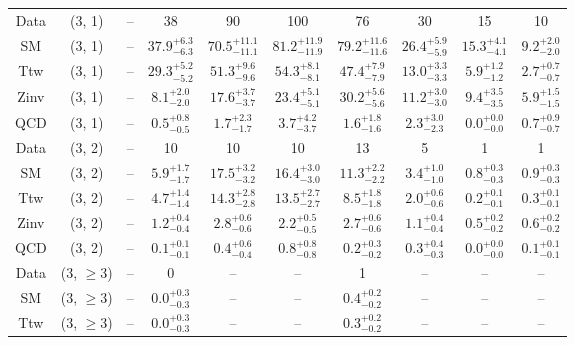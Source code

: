 \begin{table}[h!]
{\begin{tabular}{cccccccccc}
	Data & (3, 1) & -- & 38 & 90 & 100 & 76 & 30 & 15 & 10 \\[0.5ex] 
	SM & (3, 1) & -- & $37.9^{+ 6.3 }_{- 6.3 }$ & $70.5^{+ 11.1 }_{- 11.1 }$ & $81.2^{+ 11.9 }_{- 11.9 }$ & $79.2^{+ 11.6 }_{- 11.6 }$ & $26.4^{+ 5.9 }_{- 5.9 }$ & $15.3^{+ 4.1 }_{- 4.1 }$ & $9.2^{+ 2.0 }_{- 2.0 }$ \\[0.5ex] 
	Ttw & (3, 1) & -- & $29.3^{+ 5.2 }_{- 5.2 }$ & $51.3^{+ 9.6 }_{- 9.6 }$ & $54.3^{+ 8.1 }_{- 8.1 }$ & $47.4^{+ 7.9 }_{- 7.9 }$ & $13.0^{+ 3.3 }_{- 3.3 }$ & $5.9^{+ 1.2 }_{- 1.2 }$ & $2.7^{+ 0.7 }_{- 0.7 }$ \\[0.5ex] 
	Zinv & (3, 1) & -- & $8.1^{+ 2.0 }_{- 2.0 }$ & $17.6^{+ 3.7 }_{- 3.7 }$ & $23.4^{+ 5.1 }_{- 5.1 }$ & $30.2^{+ 5.6 }_{- 5.6 }$ & $11.2^{+ 3.0 }_{- 3.0 }$ & $9.4^{+ 3.5 }_{- 3.5 }$ & $5.9^{+ 1.5 }_{- 1.5 }$ \\[0.5ex] 
	QCD & (3, 1) & -- & $0.5^{+ 0.8 }_{- 0.5 }$ & $1.7^{+ 2.3 }_{- 1.7 }$ & $3.7^{+ 4.2 }_{- 3.7 }$ & $1.6^{+ 1.8 }_{- 1.6 }$ & $2.3^{+ 3.0 }_{- 2.3 }$ & $0.0^{+ 0.0 }_{- 0.0 }$ & $0.7^{+ 0.9 }_{- 0.7 }$ \\[0.5ex] 
	Data & (3, 2) & -- & 10 & 10 & 10 & 13 & 5 & 1 & 1 \\[0.5ex] 
	SM & (3, 2) & -- & $5.9^{+ 1.7 }_{- 1.7 }$ & $17.5^{+ 3.2 }_{- 3.2 }$ & $16.4^{+ 3.0 }_{- 3.0 }$ & $11.3^{+ 2.2 }_{- 2.2 }$ & $3.4^{+ 1.0 }_{- 1.0 }$ & $0.8^{+ 0.3 }_{- 0.3 }$ & $0.9^{+ 0.3 }_{- 0.3 }$ \\[0.5ex] 
	Ttw & (3, 2) & -- & $4.7^{+ 1.4 }_{- 1.4 }$ & $14.3^{+ 2.8 }_{- 2.8 }$ & $13.5^{+ 2.7 }_{- 2.7 }$ & $8.5^{+ 1.8 }_{- 1.8 }$ & $2.0^{+ 0.6 }_{- 0.6 }$ & $0.2^{+ 0.1 }_{- 0.1 }$ & $0.3^{+ 0.1 }_{- 0.1 }$ \\[0.5ex] 
	Zinv & (3, 2) & -- & $1.2^{+ 0.4 }_{- 0.4 }$ & $2.8^{+ 0.6 }_{- 0.6 }$ & $2.2^{+ 0.5 }_{- 0.5 }$ & $2.7^{+ 0.6 }_{- 0.6 }$ & $1.1^{+ 0.4 }_{- 0.4 }$ & $0.5^{+ 0.2 }_{- 0.2 }$ & $0.6^{+ 0.2 }_{- 0.2 }$ \\[0.5ex] 
	QCD & (3, 2) & -- & $0.1^{+ 0.1 }_{- 0.1 }$ & $0.4^{+ 0.6 }_{- 0.4 }$ & $0.8^{+ 0.8 }_{- 0.8 }$ & $0.2^{+ 0.3 }_{- 0.2 }$ & $0.3^{+ 0.4 }_{- 0.3 }$ & $0.0^{+ 0.0 }_{- 0.0 }$ & $0.1^{+ 0.1 }_{- 0.1 }$ \\[0.5ex] 
	Data & (3, $\ge3$) & -- & 0 & -- & -- & 1 & -- & -- & -- \\[0.5ex] 
	SM & (3, $\ge3$) & -- & $0.0^{+ 0.3 }_{- 0.3 }$ & -- & -- & $0.4^{+ 0.2 }_{- 0.2 }$ & -- & -- & -- \\[0.5ex] 
	Ttw & (3, $\ge3$) & -- & $0.0^{+ 0.3 }_{- 0.3 }$ & -- & -- & $0.3^{+ 0.2 }_{- 0.2 }$ & -- & -- & -- \\[0.5ex] 

\end{tabular}}
\end{table}
